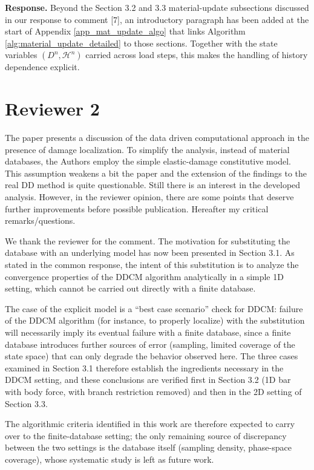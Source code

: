 \documentclass[10pt]{article}
\begin{document}
\begin{enumerate}
\textbf{Response.} Beyond the Section 3.2 and 3.3 material-update subsections discussed in our response to comment [7], an introductory paragraph has been added at the start of Appendix \ref{app_mat_update_algo} that links Algorithm \ref{alg:material_update_detailed} to those sections. Together with the state variables $(D^n, \mathcal{H}^n)$ carried across load steps, this makes the handling of history dependence explicit.

\color{black}
\end{enumerate}





\section*{Reviewer 2}
The paper presents a discussion of the data driven computational approach in the presence of damage localization. To simplify the analysis, instead of material databases, the Authors employ the simple elastic-damage constitutive model. This assumption weakens a bit the paper and the extension of the findings to the real DD method is quite questionable. Still there is an interest in the developed analysis.
However, in the reviewer opinion, there are some points that deserve further improvements before possible publication. Hereafter my critical remarks/questions.

\color{blue}
We thank the reviewer for the comment. The motivation for substituting the database with an underlying model has now been presented in Section 3.1. As stated in the common response, the intent of this substitution is to analyze the convergence properties of the DDCM algorithm analytically in a simple 1D setting, which cannot be carried out directly with a finite database.

The case of the explicit model is a ``best case scenario'' check for DDCM: failure of the DDCM algorithm (for instance, to properly localize) with the substitution will necessarily imply its eventual failure with a finite database, since a finite database introduces further sources of error (sampling, limited coverage of the state space) that can only degrade the behavior observed here. The three cases examined in Section 3.1 therefore establish the ingredients necessary in the DDCM setting, and these conclusions are verified first in Section 3.2 (1D bar with body force, with branch restriction removed) and then in the 2D setting of Section 3.3.

The algorithmic criteria identified in this work are therefore expected to carry over to the finite-database setting; the only remaining source of discrepancy between the two settings is the database itself (sampling density, phase-space coverage), whose systematic study is left as future work.
\end{document}
